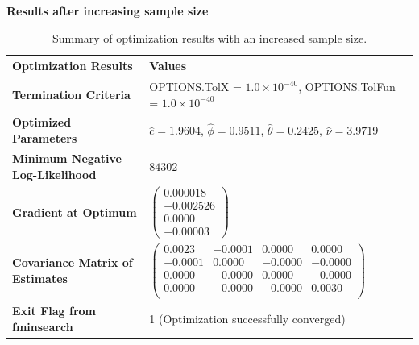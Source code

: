 \documentclass[11pt]{article}
\begin{document}
\textbf{Results after increasing sample size}
\begin{table}[h!]
\centering
\begin{tabular}{|l|l|}
\hline
\textbf{Optimization Results}              & \textbf{Values}                                                                 \\ \hline
\textbf{Termination Criteria}              & OPTIONS.TolX = $1.0 \times 10^{-40}$, OPTIONS.TolFun = $1.0 \times 10^{-40}$     \\ \hline
\textbf{Optimized Parameters}              & $\hat{c} = 1.9604$, $\hat{\phi} = 0.9511$, $\hat{\theta} = 0.2425$, $\hat{\nu} = 3.9719$ \\ \hline
\textbf{Minimum Negative Log-Likelihood}   & $84302$                                                                         \\ \hline
\textbf{Gradient at Optimum}               & $\begin{pmatrix}
0.000018 \\
-0.002526 \\
0.0000 \\
-0.00003
\end{pmatrix}$                                                                  \\ \hline
\textbf{Covariance Matrix of Estimates}    & $\begin{pmatrix}
0.0023 & -0.0001 & 0.0000 & 0.0000 \\
-0.0001 & 0.0000 & -0.0000 & -0.0000 \\
0.0000 & -0.0000 & 0.0000 & -0.0000 \\
0.0000 & -0.0000 & -0.0000 & 0.0030 \\
\end{pmatrix}$                                                                \\ \hline
\textbf{Exit Flag from fminsearch}         & 1 (Optimization successfully converged)                                         \\ \hline
\end{tabular}
\caption{Summary of optimization results with an increased sample size.}
\label{tab:optimization_large_sample}
\end{table}
\end{document}
